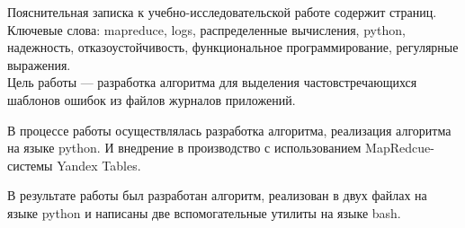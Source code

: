 Пояснительная записка к учебно-исследовательской работе содержит
\pageref{LastPage} страниц.\\

Ключевые слова: mapreduce, logs, распределенные вычисления, python, надежность,
отказоустойчивость, функциональное программирование, регулярные выражения.\\

Цель работы --- разработка алгоритма для выделения частовстречающихся шаблонов
ошибок из файлов журналов приложений.

В процессе работы осуществлялась разработка алгоритма, реализация алгоритма на
языке python. И внедрение в производство с использованием MapRedcue-системы
Yandex Tables.

В результате работы был разработан алгоритм, реализован в двух файлах на языке
python и написаны две вспомогательные утилиты на языке bash.
